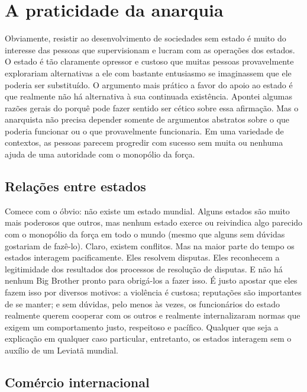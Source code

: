 \section{A praticidade da anarquia}

Obviamente, resistir ao desenvolvimento de sociedades sem estado é muito do interesse das pessoas que supervisionam e lucram com as operações dos estados. O estado é tão claramente opressor e custoso que muitas pessoas provavelmente explorariam alternativas a ele com bastante entusiasmo se imaginassem que ele poderia ser substituído. O argumento mais prático a favor do apoio ao estado é que realmente não há alternativa à sua continuada existência. Apontei algumas razões gerais do porquê pode fazer sentido ser cético sobre essa afirmação. Mas o anarquista não precisa depender somente de argumentos abstratos sobre o que poderia funcionar ou o que provavelmente funcionaria. Em uma variedade de contextos, as pessoas parecem progredir com sucesso sem muita ou nenhuma ajuda de uma autoridade com o monopólio da força.

\subsection*{Relações entre estados}

Comece com o óbvio: não existe um estado mundial. Alguns estados são muito mais poderosos que outros, mas nenhum estado exerce ou reivindica algo parecido com o monopólio da força em todo o mundo (mesmo que alguns sem dúvidas gostariam de fazê-lo). Claro, existem conflitos. Mas na maior parte do tempo os estados interagem pacificamente. Eles resolvem disputas. Eles reconhecem a legitimidade dos resultados dos processos de resolução de disputas. E não há nenhum Big Brother pronto para obrigá-los a fazer isso. É justo apostar que eles fazem isso por diversos motivos: a violência é custosa; reputações são importantes de se manter; e sem dúvidas, pelo menos às vezes, os funcionários do estado realmente querem cooperar com os outros e realmente internalizaram normas que exigem um comportamento justo, respeitoso e pacífico. Qualquer que seja a explicação em qualquer caso particular, entretanto, os estados interagem sem o auxílio de um Leviatã mundial.

\subsection*{Comércio internacional}


